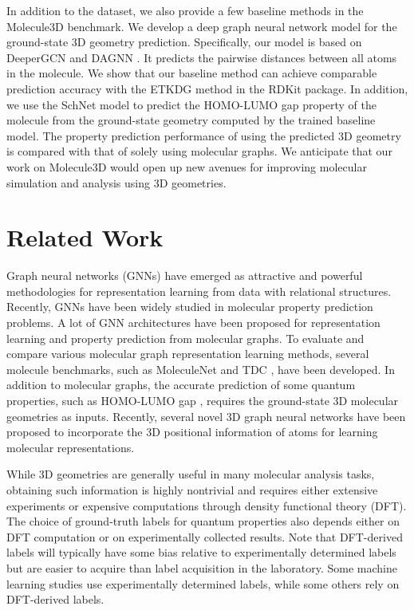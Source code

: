 \documentclass{article}
\begin{document}
In addition to the dataset, we also provide a few baseline methods in the Molecule3D benchmark. We develop a deep graph neural network model for the ground-state 3D geometry prediction. Specifically, our model is based on DeeperGCN \cite{li2020deepergcn} and DAGNN \cite{liu2020towards}. It predicts the pairwise distances between all atoms in the molecule. We show that our baseline method can achieve comparable prediction accuracy with the ETKDG \cite{riniker2015better} method in the RDKit \cite{rdkit} package. In addition, we use the SchNet \cite{schutt2017schnet} model to predict the HOMO-LUMO gap property of the molecule from the ground-state geometry computed by the trained baseline model. The property prediction performance of using the predicted 3D geometry is compared with that of solely using molecular graphs. We anticipate that our work on Molecule3D would open up new avenues for improving molecular simulation and analysis using 3D geometries.

\section{Related Work}

Graph neural networks \cite{kipf2017semi, velickovic2018graph,xu2018how,gao2018large, gao2019graph} (GNNs) have emerged as attractive and powerful methodologies for representation learning from data with relational structures. Recently, GNNs have been widely studied in molecular property prediction problems. A lot of GNN architectures \cite{duvenaud2015convolutional, kearnes2016molecular, gilmer2017neural, yang2019analyzing, wang2020advanced} have been proposed for representation learning and property prediction from molecular graphs. To evaluate and compare various molecular graph representation learning methods, several molecule benchmarks, such as MoleculeNet \cite{wu2018moleculenet} and TDC \cite{huang2021therapeutics}, have been developed. In addition to molecular graphs, the accurate prediction of some quantum properties, such as HOMO-LUMO gap \cite{hu2021ogb, liu2021fast, ying2021first,addanki2021large}, requires the ground-state 3D molecular geometries as inputs. Recently, several novel 3D graph neural networks \cite{schutt2017schnet, unke2019physnet, klicpera2019directional, liu2021spherical} have been proposed to incorporate the 3D positional information of atoms for learning molecular representations.

While 3D geometries are generally useful in many molecular analysis tasks, obtaining such information is highly nontrivial and requires either extensive experiments or expensive computations through density functional theory (DFT). The choice of ground-truth labels for quantum properties also depends either on DFT computation or on experimentally collected results. Note that DFT-derived labels will typically have some bias relative to experimentally determined labels but are easier to acquire than label acquisition in the laboratory. Some machine learning studies \cite{thawani2020photoswitch, hey2020machine} use experimentally determined labels, while some others rely on DFT-derived labels.
 
\end{document}
